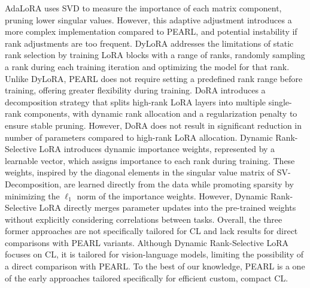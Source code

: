 \documentclass[10pt]{article} %
\begin{document}
AdaLoRA uses SVD to measure the importance of each matrix component, pruning lower singular values. However, this adaptive adjustment introduces a more complex implementation compared to PEARL, and potential instability if rank adjustments are too frequent. DyLoRA addresses the limitations of static rank selection by training LoRA blocks with a range of ranks, randomly sampling a rank during each training iteration and optimizing the model for that rank. Unlike DyLoRA, PEARL does not require setting a predefined rank range before training, offering greater flexibility during training. 
DoRA introduces a decomposition strategy that splits high-rank LoRA layers into multiple single-rank components, with dynamic rank allocation and a regularization penalty to ensure stable pruning. However, DoRA does not result in significant reduction in number of parameters compared to high-rank LoRA allocation. Dynamic Rank-Selective LoRA introduces dynamic importance weights, represented by a learnable vector, which assigns importance to each rank during training. These weights, inspired by the diagonal elements in the singular value matrix of SV-Decomposition, are learned directly from the data while promoting sparsity by minimizing the \( \ell_1 \) norm of the importance weights. However, Dynamic Rank-Selective LoRA directly merges parameter updates into the pre-trained weights without explicitly considering correlations between tasks. Overall, the three former approaches are not specifically tailored for CL and  lack results for direct comparisons with PEARL variants. Although Dynamic Rank-Selective LoRA focuses on CL, it is tailored for vision-language models, limiting the possibility of a direct comparison with PEARL. To the best of our knowledge, PEARL is a one of the early approaches tailored specifically for efficient custom, compact CL.  




\end{document}
